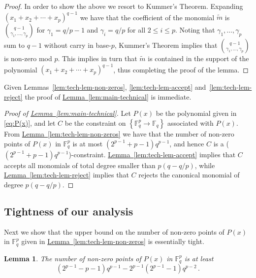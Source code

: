 \documentclass[10pt]{article}
\newtheorem{lemma}[theorem]{Lemma}
\theoremstyle{definition}
\numberwithin{equation}{section}
\newcommand{\expref}[2]{\texorpdfstring{\hyperref[#2]{#1~\ref{#2}}}{#1~\ref{#2}}}
\newcommand{\F}{{\mathbb{F}}}
\newcommand{\set}[1]{\left\{{#1}\right\}}
\begin{document}
\begin{proof}
In order to show the above we resort to Kummer's Theorem. Expanding $(x_1+x_2+ \cdots + x_p)^{q-1}$ we have that the coefficient of the monomial $\widetilde m$ is
$\binom {q-1}  {\gamma_1, \ldots, \gamma_p}$ for $\gamma_1 = q/p -1$ and $\gamma_i = q/p$ for all $2 \leq i \leq p$. Noting that $\gamma_1, \ldots, \gamma_p$ sum to $q-1$ without carry in base-$p$, Kummer's Theorem implies that $\binom {q-1}  {\gamma_1, \ldots, \gamma_p}$ is non-zero mod $p$. This implies in turn that $\widetilde m$ is contained in the support of the polynomial $(x_1+x_2+ \cdots + x_p)^{q-1}$, thus completing the proof of the lemma.
 \end{proof}

 Given Lemmas~\ref{lem:tech-lem-non-zeros}, \ref{lem:tech-lem-accept} and~\ref{lem:tech-lem-reject} the proof of \expref{Lemma}{lem:main-technical} is immediate.

 \begin{proof}[Proof of \expref{Lemma}{lem:main-technical}]
Let $P(x)$ be the polynomial given in \eqref{eq:P(x)}, and let $C$ be the constraint on $\set{\F_q^p \to \F_q}$ associated with $P(x)$. {}From \expref{Lemma}{lem:tech-lem-non-zeros}
we have that the number of non-zero points of $P(x)$ in $\F_q^p$ is at most $(2^{p-1} + p-1)q^{p-1}$, and hence $C$ is a
($(2^{p-1}+p-1)q^{p-1}$)-constraint. \expref{Lemma}{lem:tech-lem-accept} implies that $C$ accepts all monomials of total degree smaller
than $p(q-q/p)$, while \expref{Lemma}{lem:tech-lem-reject} implies that $C$ rejects the canonical monomial of degree $p(q-q/p)$.
 \end{proof}

\subsection{Tightness of our analysis}

Next we show that the upper bound on the number of non-zero points of $P(x)$ in $\F_q^p$ given in \expref{Lemma}{lem:tech-lem-non-zeros}
is essentially tight.

\begin{lemma}\label{lem:tech-lem-non-zeros-lb}
The number of non-zero points of $P(x)$ in $\F_q^p$ is at least \[(2^{p-1}-p-1)q^{p-1} - 2^{p-1}(2^{p-1}-1)q^{p-2} \,.\]
\end{lemma}
\end{document}
